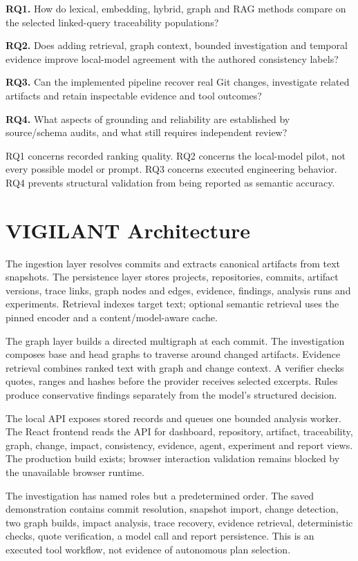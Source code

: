 \documentclass[
  11pt,
  a4paper,
]{report}
\begin{document}
\textbf{RQ1.} How do lexical, embedding, hybrid, graph and RAG methods
compare on the selected linked-query traceability populations?

\textbf{RQ2.} Does adding retrieval, graph context, bounded
investigation and temporal evidence improve local-model agreement with
the authored consistency labels?

\textbf{RQ3.} Can the implemented pipeline recover real Git changes,
investigate related artifacts and retain inspectable evidence and tool
outcomes?

\textbf{RQ4.} What aspects of grounding and reliability are established
by source/schema audits, and what still requires independent review?

RQ1 concerns recorded ranking quality. RQ2 concerns the local-model
pilot, not every possible model or prompt. RQ3 concerns executed
engineering behavior. RQ4 prevents structural validation from being
reported as semantic accuracy.

\hypertarget{vigilant-architecture}{%
\chapter{VIGILANT Architecture}\label{vigilant-architecture}}

The ingestion layer resolves commits and extracts canonical artifacts
from text snapshots. The persistence layer stores projects,
repositories, commits, artifact versions, trace links, graph nodes and
edges, evidence, findings, analysis runs and experiments. Retrieval
indexes target text; optional semantic retrieval uses the pinned encoder
and a content/model-aware cache.

The graph layer builds a directed multigraph at each commit. The
investigation composes base and head graphs to traverse around changed
artifacts. Evidence retrieval combines ranked text with graph and change
context. A verifier checks quotes, ranges and hashes before the provider
receives selected excerpts. Rules produce conservative findings
separately from the model's structured decision.

The local API exposes stored records and queues one bounded analysis
worker. The React frontend reads the API for dashboard, repository,
artifact, traceability, graph, change, impact, consistency, evidence,
agent, experiment and report views. The production build exists; browser
interaction validation remains blocked by the unavailable browser
runtime.

The investigation has named roles but a predetermined order. The saved
demonstration contains commit resolution, snapshot import, change
detection, two graph builds, impact analysis, trace recovery, evidence
retrieval, deterministic checks, quote verification, a model call and
report persistence. This is an executed tool workflow, not evidence of
autonomous plan selection.
\end{document}
